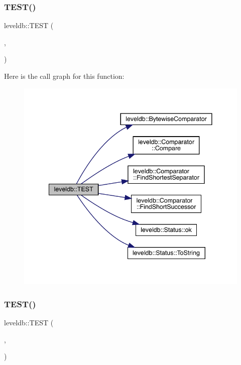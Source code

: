 \subsubsection{\texorpdfstring{TEST()}{TEST()}\hspace{0.1cm}{\footnotesize\ttfamily [86/102]}}
{\footnotesize\ttfamily leveldb\+::\+T\+E\+ST (\begin{DoxyParamCaption}\item[{\mbox{\hyperlink{classleveldb_1_1_d_b_test}{D\+B\+Test}}}]{,  }\item[{Comparator\+Check}]{ }\end{DoxyParamCaption})}

Here is the call graph for this function\+:
\nopagebreak
\begin{figure}[H]
\begin{center}
\leavevmode
\includegraphics[width=341pt]{namespaceleveldb_a5cd6c2754610c66f4dd998874482c80b_cgraph}
\end{center}
\end{figure}
\mbox{\label{namespaceleveldb_a38772a8b86ea7658430b1fa2f1a5d83e}} 
\subsubsection{\texorpdfstring{TEST()}{TEST()}\hspace{0.1cm}{\footnotesize\ttfamily [87/102]}}
{\footnotesize\ttfamily leveldb\+::\+T\+E\+ST (\begin{DoxyParamCaption}\item[{\mbox{\hyperlink{classleveldb_1_1_d_b_test}{D\+B\+Test}}}]{,  }\item[{Custom\+Comparator}]{ }\end{DoxyParamCaption})}

